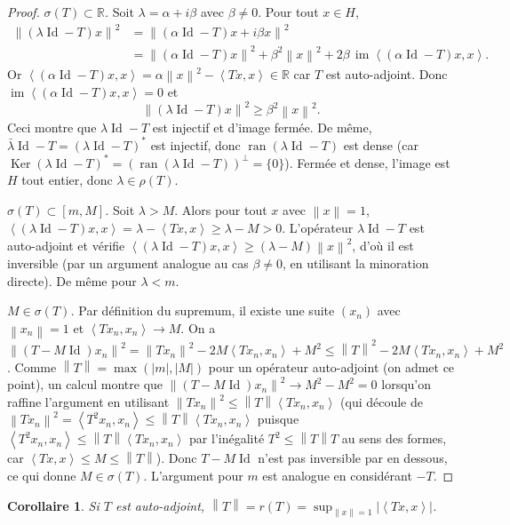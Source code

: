 \documentclass[a4paper,12pt]{book}
\DeclareMathOperator{\im}{im}
\DeclareMathOperator{\Id}{Id}
\DeclareMathOperator{\Ker}{Ker}
\DeclareMathOperator{\ran}{ran}
\newcommand{\R}{\mathbb{R}}
\newcommand{\norm}[1]{\left\| #1 \right\|}
\newcommand{\abs}[1]{\left| #1 \right|}
\newcommand{\inner}[2]{\left\langle #1, #2 \right\rangle}
\theoremstyle{definition}
\theoremstyle{plain}
\newtheorem{corollaire}[definition]{Corollaire}
\theoremstyle{remark}
\begin{document}
\begin{proof}
\emph{$\sigma(T) \subset \R$.}
Soit $\lambda = \alpha + i\beta$ avec $\beta \neq 0$. Pour tout $x \in H$,
\begin{align*}
    \norm{(\lambda\Id - T)x}^2
    &= \norm{(\alpha\Id - T)x + i\beta x}^2 \\
    &= \norm{(\alpha\Id - T)x}^2 + \beta^2\norm{x}^2
       + 2\beta\, \im\inner{(\alpha\Id - T)x}{x}.
\end{align*}
Or $\inner{(\alpha\Id - T)x}{x} = \alpha\norm{x}^2 - \inner{Tx}{x} \in \R$ car $T$
est auto-adjoint. Donc $\im\inner{(\alpha\Id-T)x}{x} = 0$ et
\[
    \norm{(\lambda\Id - T)x}^2 \geq \beta^2\norm{x}^2.
\]
Ceci montre que $\lambda\Id - T$ est injectif et d'image fermée. De même,
$\bar{\lambda}\Id - T = (\lambda\Id - T)^*$ est injectif, donc
$\ran(\lambda\Id - T)$ est dense (car $\Ker(\lambda\Id-T)^* = (\ran(\lambda\Id-T))^\perp = \{0\}$).
Fermée et dense, l'image est $H$ tout entier, donc $\lambda \in \rho(T)$.

\emph{$\sigma(T) \subset [m, M]$.}
Soit $\lambda > M$. Alors pour tout $x$ avec $\norm{x} = 1$,
$\inner{(\lambda\Id - T)x}{x} = \lambda - \inner{Tx}{x} \geq \lambda - M > 0$.
L'opérateur $\lambda\Id - T$ est auto-adjoint et vérifie
$\inner{(\lambda\Id - T)x}{x} \geq (\lambda - M)\norm{x}^2$, d'où il est inversible
(par un argument analogue au cas $\beta \neq 0$, en utilisant la minoration directe).
De même pour $\lambda < m$.

\emph{$M \in \sigma(T)$.}
Par définition du supremum, il existe une suite $(x_n)$ avec $\norm{x_n} = 1$ et
$\inner{Tx_n}{x_n} \to M$. On a
$\norm{(T - M\Id)x_n}^2 = \norm{Tx_n}^2 - 2M\inner{Tx_n}{x_n} + M^2
\leq \norm{T}^2 - 2M\inner{Tx_n}{x_n} + M^2$.
Comme $\norm{T} = \max(\abs{m}, \abs{M})$ pour un opérateur auto-adjoint (on admet ce
point), un calcul montre que $\norm{(T-M\Id)x_n}^2 \to M^2 - M^2 = 0$
lorsqu'on raffine l'argument en utilisant $\norm{Tx_n}^2 \leq \norm{T}\inner{Tx_n}{x_n}$
(qui découle de $\norm{Tx_n}^2 = \inner{T^2 x_n}{x_n} \leq \norm{T}\inner{Tx_n}{x_n}$
puisque $\inner{T^2x_n}{x_n} \leq \norm{T}\inner{Tx_n}{x_n}$ par l'inégalité
$T^2 \leq \norm{T}T$ au sens des formes, car $\inner{Tx}{x} \leq M \leq \norm{T}$).
Donc $T - M\Id$ n'est pas inversible par en dessous, ce qui donne $M \in \sigma(T)$.
L'argument pour $m$ est analogue en considérant $-T$.
\end{proof}

\begin{corollaire}\label{cor:sa-norme-spectre}
Si $T$ est auto-adjoint, $\norm{T} = r(T) = \sup_{\norm{x}=1} \abs{\inner{Tx}{x}}$.
\end{corollaire}
\end{document}
